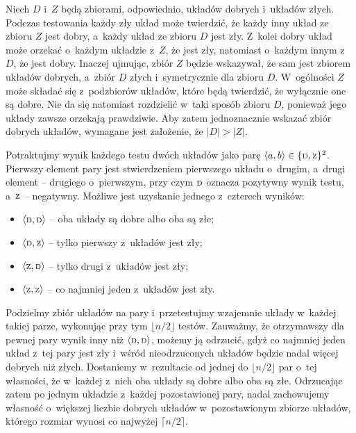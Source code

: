 
\subproblem %
Niech $D$ i~$Z$ będą zbiorami, odpowiednio, układów dobrych i~układów złych.
Podczas testowania każdy zły układ może twierdzić, że każdy inny układ ze zbioru $Z$ jest dobry, a~każdy układ ze zbioru $D$ jest zły.
Z~kolei dobry układ może orzekać o~każdym układzie z~$Z$, że jest zły, natomiast o~każdym innym z~$D$, że jest dobry.
Inaczej ujmując, zbiór $Z$ będzie wskazywał, że sam jest zbiorem układów dobrych, a~zbiór $D$ złych i~symetrycznie dla zbioru $D$.
W~ogólności $Z$ może składać się z~podzbiorów układów, które będą twierdzić, że wyłącznie one są dobre.
Nie da się natomiast rozdzielić w~taki sposób zbioru $D$, ponieważ jego układy zawsze orzekają prawdziwie.
Aby zatem jednoznacznie wskazać zbiór dobrych układów, wymagane jest założenie, że $|D|>|Z|$.

\subproblem %
Potraktujmy wynik każdego testu dwóch układów jako parę $\langle a,b\rangle\in\{{\scriptstyle\rm D},{\scriptstyle\rm Z}\}^2$.
Pierwszy element pary jest stwierdzeniem pierwszego układu o~drugim, a~drugi element -- drugiego o~pierwszym, przy czym ${\scriptstyle\rm D}$ oznacza pozytywny wynik testu, a~${\scriptstyle\rm Z}$ -- negatywny.
Możliwe jest uzyskanie jednego z~czterech wyników:
\begin{itemize}
	\item $\langle{\scriptstyle\rm D},{\scriptstyle\rm D}\rangle$ -- oba układy są dobre albo oba są złe;
	\item $\langle{\scriptstyle\rm D},{\scriptstyle\rm Z}\rangle$ -- tylko pierwszy z~układów jest zły;
	\item $\langle{\scriptstyle\rm Z},{\scriptstyle\rm D}\rangle$ -- tylko drugi z~układów jest zły;
	\item $\langle{\scriptstyle\rm Z},{\scriptstyle\rm Z}\rangle$ -- co najmniej jeden z~układów jest zły.
\end{itemize}

Podzielmy zbiór układów na pary i~przetestujmy wzajemnie układy w~każdej takiej parze, wykonując przy tym $\lfloor n/2\rfloor$ testów.
Zauważmy, że otrzymawszy dla pewnej pary wynik inny niż $\langle{\scriptstyle\rm D},{\scriptstyle\rm D}\rangle$, możemy ją odrzucić, gdyż co najmniej jeden układ z~tej pary jest zły i~wśród nieodrzuconych układów będzie nadal więcej dobrych niż złych.
Dostaniemy w~rezultacie od jednej do $\lfloor n/2\rfloor$ par o~tej własności, że w~każdej z~nich oba układy są dobre albo oba są złe.
Odrzucając zatem po jednym układzie z~każdej pozostawionej pary, nadal zachowujemy własność o~większej liczbie dobrych układów w~pozostawionym zbiorze układów, którego rozmiar wynosi co najwyżej $\lceil n/2\rceil$.

